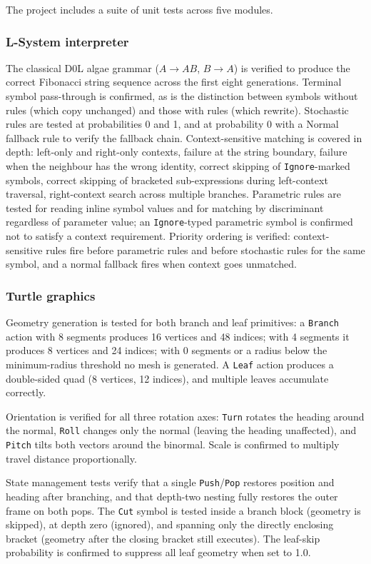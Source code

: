 The project includes a suite of unit tests across five modules.

\subsubsection{L-System interpreter}
The classical D0L algae grammar ($A \to AB$, $B \to A$) is verified to produce the correct Fibonacci string
sequence across the first eight generations. Terminal symbol pass-through is confirmed, as is the distinction
between symbols without rules (which copy unchanged) and those with rules (which rewrite). Stochastic rules
are tested at probabilities 0 and 1, and at probability 0 with a Normal fallback rule to verify the fallback
chain. Context-sensitive matching is covered in depth: left-only and right-only contexts, failure at the
string boundary, failure when the neighbour has the wrong identity, correct skipping of
\texttt{Ignore}-marked symbols, correct skipping of bracketed sub-expressions during left-context traversal,
right-context search across multiple branches. Parametric rules are tested for reading inline symbol values
and for matching by discriminant regardless of parameter value; an \texttt{Ignore}-typed parametric symbol is
confirmed not to satisfy a context requirement. Priority ordering is verified: context-sensitive rules fire
before parametric rules and before stochastic rules for the same symbol, and a normal fallback fires when
context goes unmatched.

\subsubsection{Turtle graphics}
Geometry generation is tested for both branch and leaf primitives: a \texttt{Branch} action with 8 segments
produces 16 vertices and 48 indices; with 4 segments it produces 8 vertices and 24 indices; with 0 segments
or a radius below the minimum-radius threshold no mesh is generated. A \texttt{Leaf} action produces a
double-sided quad (8 vertices, 12 indices), and multiple leaves accumulate correctly.

\medskip
Orientation is verified for all three rotation axes: \texttt{Turn} rotates the heading around the normal,
\texttt{Roll} changes only the normal (leaving the heading unaffected), and \texttt{Pitch} tilts both vectors
around the binormal. Scale is confirmed to multiply travel distance proportionally.

\medskip
State management tests verify that a single \texttt{Push}/\texttt{Pop} restores position and heading after
branching, and that depth-two nesting fully restores the outer frame on both pops. The \texttt{Cut} symbol is
tested inside a branch block (geometry is skipped), at depth zero (ignored), and spanning only the directly
enclosing bracket (geometry after the closing bracket still executes). The leaf-skip probability is confirmed
to suppress all leaf geometry when set to 1.0.

